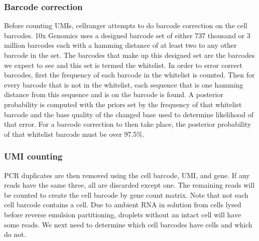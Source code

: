 \subsubsection{Barcode correction}
\par{
Before counting UMIs, cellranger attempts to do barcode correction on the cell barcodes. 10x Genomics uses a designed barcode set of either 737 thousand or 3 million barcodes each with a hamming distance\cite{hamming} of at least two to any other barcode in the set. The barcodes that make up this designed set are the barcodes we expect to see and this set is termed the whitelist. In order to error correct barcodes, first the frequency of each barcode in the whitelist is counted. Then for every barcode that is not in the whitelist, each sequence that is one hamming distance from this sequence and is on the barcode is found. A posterior probability is computed with the priors set by the frequency of that whitelist barcode and the base quality of the changed base used to determine likelihood of that error. For a barcode correction to then take place, the posterior probability of that whitelist barcode must be over 97.5\%\cite{barcodecorrection}.
}

\subsubsection{UMI counting}

\par{
PCR duplicates are then removed using the cell barcode, UMI, and gene. If any reads have the same three, all are discarded except one. The remaining reads will be counted to create the cell barcode by gene count matrix. Note that not each cell barcode contains a cell. Due to ambient RNA in solution from cells lysed before reverse emulsion partitioning, droplets without an intact cell will have some reads. We next need to determine which cell barcodes have cells and which do not.
}




